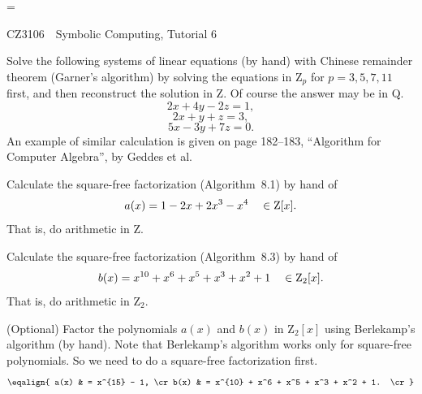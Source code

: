\magnification=

\nopagenumbers


\centerline{\titlefont CZ3106\ \  Symbolic Computing, Tutorial 6}
\bigskip
\bigskip
{}
\bigskip
\bigskip


\bigskip
\problem Solve the following systems of linear equations (by hand) with
Chinese remainder theorem (Garner's algorithm) by solving the
equations in Z$_p$ for $p=3, 5, 7, 11$ first, and then reconstruct the
solution in Z.  Of course the answer may be in Q. 
$$ 2x + 4y - 2z = 1,$$
$$ 2x + y + z = 3, $$
$$ 5x - 3y + 7z = 0.$$
An example of similar calculation is given on page 182--183, ``Algorithm
for Computer Algebra'', by Geddes et al.

\bigskip
\problem Calculate the square-free factorization (Algorithm~8.1) by hand of
$$ a(x) = 1 - 2x + 2 x^3 - x^4 \quad \in {\rm Z}[x].$$
That is, do arithmetic in Z.

\bigskip
\problem Calculate the square-free factorization (Algorithm~8.3) by hand of
$$ b(x) = x^{10} + x^6 + x^5 + x^3 + x^2 + 1 \quad \in {\rm Z}_2[x].$$
That is, do arithmetic in Z$_2$.

\bigskip
\problem (Optional) Factor the polynomials $a(x)$ and $b(x)$ in Z$_2[x]$ using Berlekamp's
algorithm (by hand).  Note that Berlekamp's algorithm works only for 
square-free polynomials.  So we need to do a square-free factorization
first.
$$\eqalign{ a(x) & =  x^{15} - 1, \cr
b(x) & =  x^{10} + x^6 + x^5 + x^3 + x^2 + 1. \cr
}$$

\bye
